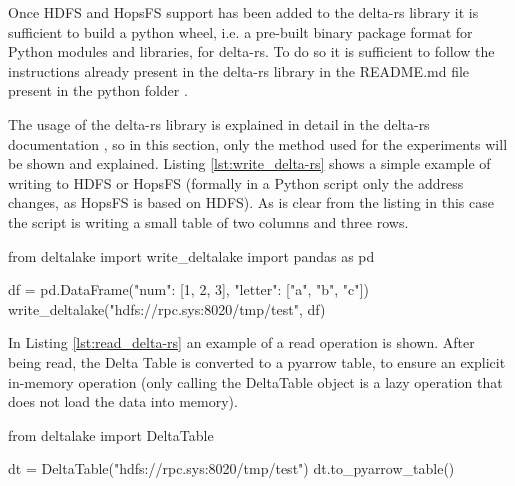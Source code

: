 Once \gls{HDFS} and \gls{HopsFS} support has been added to the delta-rs library it is sufficient to build a python wheel, i.e. a pre-built binary package format for Python modules and libraries, for delta-rs. To do so it is sufficient to follow the instructions already present in the delta-rs library in the README.md file present in the python folder \cite{DeltarsPythonMain}.

The usage of the delta-rs library is explained in detail in the delta-rs documentation \cite{DeltaioDeltars2024}, so in this section, only the method used for the experiments will be shown and explained. Listing \ref{lst:write_delta-rs} shows a simple example of writing to \gls{HDFS} or \gls{HopsFS} (formally in a Python script only the address changes, as \gls{HopsFS} is based on \gls{HDFS}). As is clear from the listing in this case the script is writing a small table of two columns and three rows.

\begin{python}[caption={Writing a data frame on a Delta Table with delta-rs on \gls{HDFS} or \gls{HopsFS}}, label={lst:write_delta-rs}]
from deltalake import write_deltalake
import pandas as pd

df = pd.DataFrame({"num": [1, 2, 3], 
                   "letter": ["a", "b", "c"]})
write_deltalake("hdfs://rpc.sys:8020/tmp/test", df)
\end{python}
\medskip

In Listing \ref{lst:read_delta-rs} an example of a read operation is shown. After being read, the Delta Table is converted to a pyarrow table, to ensure an explicit in-memory operation (only calling the DeltaTable object is a lazy operation that does not load the data into memory).

\begin{python}[caption={Reading a data frame on a Delta Table with delta-rs on \gls{HDFS} or \gls{HopsFS}}, label={lst:read_delta-rs}]
from deltalake import DeltaTable

dt = DeltaTable("hdfs://rpc.sys:8020/tmp/test")
dt.to_pyarrow_table()
\end{python}